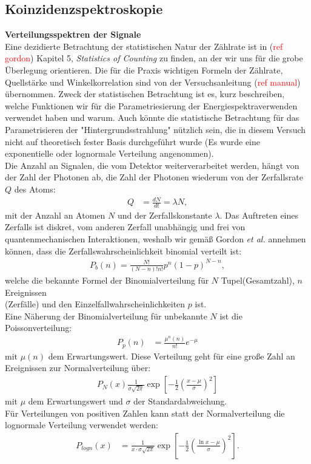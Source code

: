 \documentclass[%
aps,
onecolumn,
11pt,
tightenlines,
nofootinbib,
superscriptaddress,
floatfix,
prd,
]{revtex4-2}
\begin{document}
\subsection{Koinzidenzspektroskopie}
\label{sec:Koinzidenzspektroskopie}
\noindent \textbf{Verteilungsspektren der Signale}\\
Eine dezidierte Betrachtung der statistischen Natur der Zählrate ist in (\textcolor{red}{ref gordon}) Kapitel 5, \textit{Statistics of Counting} zu finden, an der wir uns für die grobe Überlegung orientieren. Die für die Praxis wichtigen Formeln der Zählrate, Quellstärke und Winkelkorrelation sind von der Versuchsanleitung (\textcolor{red}{ref manual}) übernommen. Zweck der statistischen Betrachtung ist es, kurz beschreiben, welche Funktionen wir für die Parametriesierung der Energiespektraverwenden verwendet haben und warum. Auch könnte die statistische Betrachtung für das Parametrisieren der "Hintergrundsstrahlung" nützlich sein, die in diesem Versuch nicht auf theoretisch fester Basis durchgeführt wurde (Es wurde eine exponentielle oder lognormale Verteilung angenommen).\\
Die Anzahl an Signalen, die vom Detektor weiterverarbeitet werden, hängt von der Zahl der Photonen ab, die Zahl der Photonen wiederum von der Zerfallsrate $Q$ des Atoms:
\begin{align}
	Q &= \frac{dN}{dt} = \lambda N, 
\end{align}
mit der Anzahl an Atomen $N$ und der Zerfallskonstante $\lambda$. Das Auftreten eines Zerfalls ist diskret, vom anderen Zerfall unabhängig und frei von quantenmechanischen Interaktionen, weshalb wir gemäß Gordon \textit{et al.} annehmen können, dass die Zerfallswahrscheinlichkeit binomial verteilt ist:
\begin{align}
	P_b(n) = \frac{N!}{(N - n)!n!}p^n(1-p)^{N-n},
\end{align}
welche die bekannte Formel der Binomialverteilung für $N$ Tupel(Gesamtzahl), $n$ Ereignissen \\(Zerfälle) und den Einzelfallwahrscheinlichkeiten $p$ ist. \\
Eine Näherung der Binomialverteilung für unbekannte $N$ ist die Poissonverteilung:
\begin{align}
	P_p(n) &= \frac{\mu^n(n)}{n!}e^{-\mu}
\end{align}
mit $\mu(n)$ dem Erwartungswert. Diese Verteilung geht für eine große Zahl an Ereignissen zur Normalverteilung über:
\begin{align}
	\label{eq:gaussian}
	P_N(x)\frac{1}{\sigma \sqrt{2\pi}} \exp \left[ -\frac{1}{2} \left( \frac{x-\mu}{\sigma} \right)^2 \right ]
\end{align}
mit $\mu$ dem Erwartungswert und $\sigma$ der Standardabweichung. \\
Für Verteilungen von positiven Zahlen kann statt der Normalverteilung die lognormale Verteilung verwendet werden:
\begin{align}
	\label{eq:lognormal}
	P_{logn}(x) &= \frac{1}{x \cdot \sigma \sqrt{2\pi}} \exp \left[ -\frac{1}{2} \left ( \frac{\ln x - \mu}{\sigma} \right )^2  \right].
\end{align}
\end{document}
